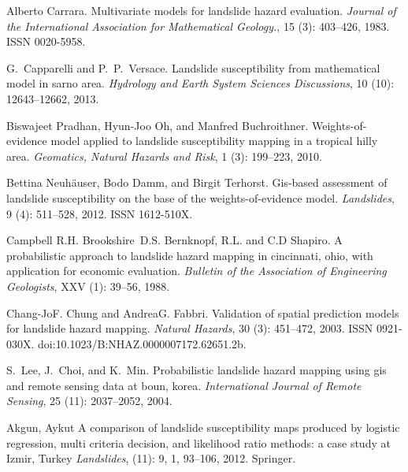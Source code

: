 \documentclass[11pt,twoside]{rmta2010eng}%
\begin{document}
\begin{thebibliography}{99}
Alberto Carrara.
\newblock Multivariate models for landslide hazard evaluation.
\newblock \emph{Journal of the International Association for Mathematical
  Geology.}, 15 (3): 403--426, 1983.
\newblock ISSN 0020-5958.


G.~Capparelli and P.~P.~Versace.
\newblock Landslide susceptibility from mathematical model in sarno area.
\newblock \emph{Hydrology and Earth System Sciences Discussions}, 10
  (10): 12643--12662, 2013.


Biswajeet Pradhan, Hyun-Joo Oh, and Manfred Buchroithner.
\newblock Weights-of-evidence model applied to landslide susceptibility mapping
  in a tropical hilly area.
\newblock \emph{Geomatics, Natural Hazards and Risk}, 1 (3):
  199--223, 2010.
  
  
Bettina Neuh\"auser, Bodo Damm, and Birgit Terhorst.
\newblock Gis-based assessment of landslide susceptibility on the base of the
  weights-of-evidence model.
\newblock \emph{Landslides}, 9 (4): 511--528, 2012.
\newblock ISSN 1612-510X.


Campbell R.H. Brookshire~D.S. Bernknopf, R.L. and C.D Shapiro.
\newblock A probabilistic approach to landslide hazard mapping in cincinnati,
  ohio, with application for economic evaluation.
\newblock \emph{Bulletin of the Association of Engineering Geologists},
  XXV (1): 39--56, 1988.
  
  
Chang-JoF. Chung and AndreaG. Fabbri.
\newblock Validation of spatial prediction models for landslide hazard mapping.
\newblock \emph{Natural Hazards}, 30 (3): 451--472, 2003.
\newblock ISSN 0921-030X.
\newblock doi:{10.1023/B:NHAZ.0000007172.62651.2b}.

S.~Lee, J.~Choi, and K.~Min.
\newblock Probabilistic landslide hazard mapping using gis and remote sensing
  data at boun, korea.
\newblock \emph{International Journal of Remote Sensing}, 25
  (11): 2037--2052, 2004.
  
  
  
Akgun, Aykut
\newblock A comparison of landslide susceptibility maps produced by logistic regression, multi criteria decision, and likelihood ratio methods: a case study at Izmir, Turkey
\newblock \emph{Landslides},
  (11): 9, 1, 93--106, 2012.
\newblock Springer. 



\end{thebibliography}
\end{document}
